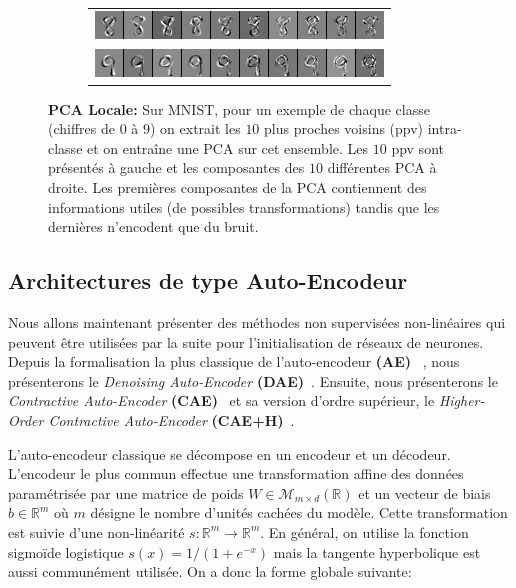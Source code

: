 \begin{figure}
\begin{subfigure}{0.45\textwidth}
\begin{tabular}{c}
  \includegraphics[width=0.90\linewidth]{predoc/images/8_eigenvectors.png}\\
  \includegraphics[width=0.90\linewidth]{predoc/images/9_eigenvectors.png}
\end{tabular}
\end{subfigure}

   \caption[Vecteurs propres d'une PCA sur les 10-ppv de classes de MNIST]{{\bf PCA Locale:} Sur MNIST, pour un exemple de chaque classe (chiffres de $0$ à $9$) on
   extrait les $10$ plus proches voisins (ppv) intra-classe et on entraîne une PCA sur cet
   ensemble. Les $10$ ppv sont présentés à gauche et les
   composantes des $10$ différentes PCA à droite. Les premières composantes de
   la PCA contiennent des informations utiles (de possibles transformations)
   tandis que les dernières n'encodent que du bruit.}

\label{fig:mnistpca}
\end{figure}

\subsection{Architectures de type Auto-Encodeur}

Nous allons maintenant présenter des méthodes non supervisées non-linéaires qui peuvent être utilisées par la suite pour
l'initialisation de réseaux de neurones.
Depuis la formalisation la plus classique de l'auto-encodeur
\textbf{(AE)}~\citep{Gallinari87} , nous présenterons le \textit{Denoising
Auto-Encoder} \textbf{(DAE)}~\citep{VincentPLarochelleH2008,Vincent-JMLR-2010}.
Ensuite, nous présenterons le \textit{Contractive Auto-Encoder}
\textbf{(CAE)}~\citep{Rifai+al-2011} et sa version d'ordre supérieur,
le \textit{Higher-Order Contractive Auto-Encoder}
\textbf{(CAE+H)}~\citep{Salah+al-2011}.

L'auto-encodeur classique se décompose en un encodeur et un décodeur.
L'encodeur le plus commun effectue une transformation affine des données paramétrisée par une
matrice de poids $W\in\mathcal{M}_{m\times d}(\mathbb{R})$ et un vecteur de biais $b\in\mathbb{R}^m$ où $m$ désigne le
nombre d'unités cachées du modèle.
Cette transformation est suivie d'une non-linéarité $s:\mathbb{R}^m \rightarrow
\mathbb{R}^m$. En général, on utilise la
fonction sigmoïde logistique $s(x)=1/(1+e^{-x})$ mais la tangente hyperbolique est aussi
communément utilisée. On a donc la forme globale suivante:

